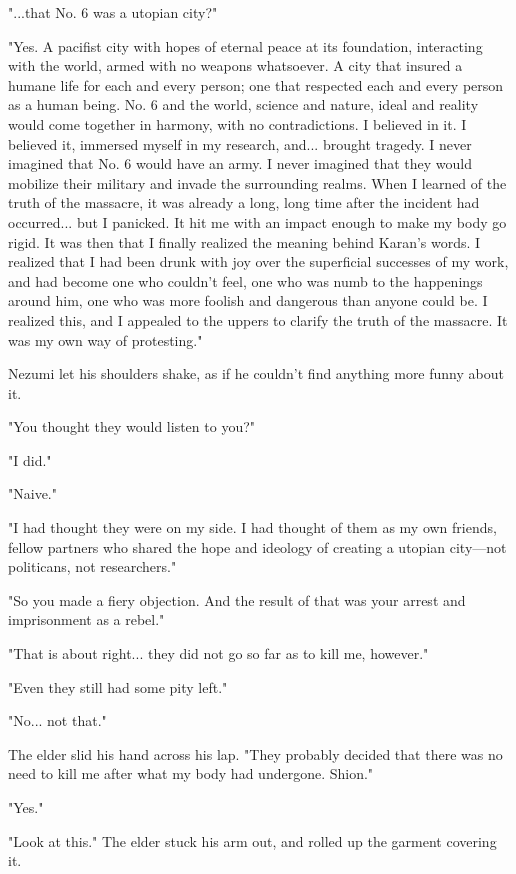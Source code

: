 "...that No. 6 was a utopian city?"

"Yes. A pacifist city with hopes of eternal peace at its foundation,
interacting with the world, armed with no weapons whatsoever. A city
that insured a humane life for each and every person; one that respected
each and every person as a human being. No. 6 and the world, science and
nature, ideal and reality would come together in harmony, with no
contradictions. I believed in it. I believed it, immersed myself in my
research, and... brought tragedy. I never imagined that No. 6 would have
an army. I never imagined that they would mobilize their military and
invade the surrounding realms. When I learned of the truth of the
massacre, it was already a long, long time after the incident had
occurred... but I panicked. It hit me with an impact enough to make my
body go rigid. It was then that I finally realized the meaning behind
Karan's words. I realized that I had been drunk with joy over the
superficial successes of my work, and had become one who couldn't feel,
one who was numb to the happenings around him, one who was more foolish
and dangerous than anyone could be. I realized this, and I appealed to
the uppers to clarify the truth of the massacre. It was my own way of
protesting."

Nezumi let his shoulders shake, as if he couldn't find anything more
funny about it.

"You thought they would listen to you?"

"I did."

"Naive."

"I had thought they were on my side. I had thought of them as my own
friends, fellow partners who shared the hope and ideology of creating a
utopian city---not politicans, not researchers."

"So you made a fiery objection. And the result of that was your arrest
and imprisonment as a rebel."

"That is about right... they did not go so far as to kill me, however."

"Even they still had some pity left."

"No... not that."

The elder slid his hand across his lap. "They probably decided that
there was no need to kill me after what my body had undergone. Shion."

"Yes."

"Look at this." The elder stuck his arm out, and rolled up the garment
covering it.

